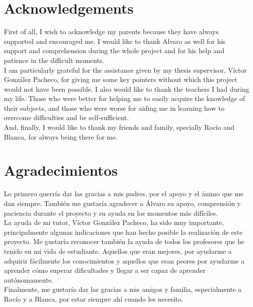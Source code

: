 \chapter{Acknowledgements}
    


First of all, I wish to acknowledge my parents because they have always supported and encouraged me. 
I would like to thank Alvaro as well for his support and comprehension during the whole project and for his help and patience in the difficult moments. 
\\

I am particularly grateful for the assistance given by my thesis supervisor, Víctor González Pacheco, for giving me some key pointers without which this project would not have been possible. 
I also would like to thank the teachers I had during my life. Those who were better for helping me to easily acquire the knowledge of their subjects, and those who were worse for aiding me in learning how to overcome difficulties and be self-sufficient. 
\\

And, finally, I would like to thank my friends and family, specially Rocío and Blanca, for always being there for me. 


\begingroup
\let\clearpage\relax
\chapter{Agradecimientos}
\endgroup
Lo primero querría dar las gracias a mis padres, por el apoyo y el ánimo que me dan siempre. 
También me gustaría agradecer a Álvaro su apoyo, comprensión y paciencia durante el proyecto y su ayuda en los momentos más difíciles. 
\\

La ayuda de mi tutor, Víctor González Pacheco, ha sido muy importante, principalmente algunas indicaciones que han hecho posible la realización de este proyecto. 
Me gustaría reconocer también la ayuda de todos los profesores que he tenido en mi vida de estudiante. 
Aquellos que eran mejores, por ayudarme a adquirir fácilmente los conocimientos y aquellos que eran peores por ayudarme a aprender cómo superar dificultades y llegar a ser capaz de aprender autónomamente. 
\\

Finalmente, me gustaría dar las gracias a mis amigos y familia, especialmente a Rocío y a Blanca, por estar siempre ahí cuando les necesito. 